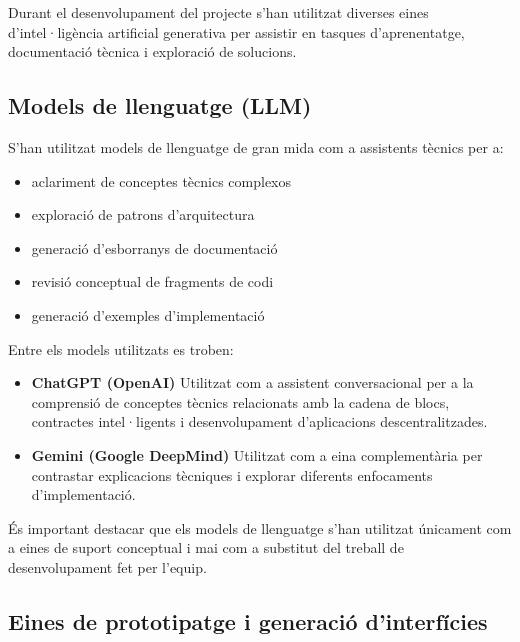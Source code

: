 Durant el desenvolupament del projecte s'han utilitzat diverses eines d'intel·ligència artificial generativa per
assistir en tasques d'aprenentatge, documentació tècnica i exploració de solucions.

\subsection{Models de llenguatge (LLM)}\label{subsec:models-de-llenguatge-(llm)}

S'han utilitzat models de llenguatge de gran mida com a assistents tècnics per a:

\begin{itemize}

    \item aclariment de conceptes tècnics complexos
    \item exploració de patrons d'arquitectura
    \item generació d'esborranys de documentació
    \item revisió conceptual de fragments de codi
    \item generació d'exemples d'implementació

\end{itemize}

Entre els models utilitzats es troben:

\begin{itemize}

    \item \textbf{ChatGPT (OpenAI)} Utilitzat com a assistent conversacional per a la comprensió de conceptes tècnics
    relacionats amb la cadena de blocs, contractes intel·ligents i desenvolupament d'aplicacions descentralitzades.

    \item \textbf{Gemini (Google DeepMind)} Utilitzat com a eina complementària per contrastar explicacions tècniques i
    explorar diferents enfocaments d'implementació.

\end{itemize}

És important destacar que els models de llenguatge s'han utilitzat únicament com a eines de suport conceptual i mai com
a substitut del treball de desenvolupament fet per l'equip.

\subsection{Eines de prototipatge i generació d'interfícies}\label{subsec:eines-de-prototipatge-i-generacio-d'interficies}

